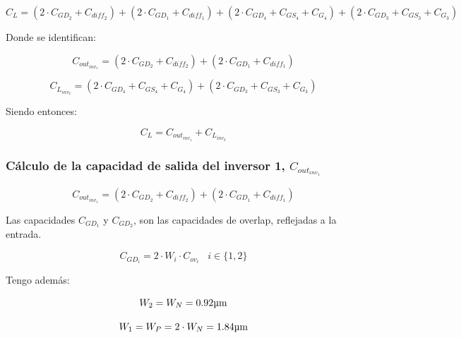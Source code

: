 \begin{equation}
C_{L} = \left( 2 \cdot C_{GD_{2}} + C_{diff_{2}} \right) + \left( 2 \cdot C_{GD_{1}} + C_{diff_{1}} \right) + \left( 2 \cdot C_{GD_{4}} + C_{GS_{4}} + C_{G_{4}} \right) + \left( 2 \cdot C_{GD_{3}} + C_{GS_{3}} + C_{G_{3}} \right)
\end{equation}


Donde se identifican:


\begin{equation*}
C_{out_{inv_{1}}} = \left( 2 \cdot C_{GD_{2}} + C_{diff_{2}} \right) + \left( 2 \cdot C_{GD_{1}} + C_{diff_{1}} \right)
\end{equation*}


\begin{equation*}
C_{L_{inv_{2}}} = \left( 2 \cdot C_{GD_{4}} + C_{GS_{4}} + C_{G_{4}} \right) + \left( 2 \cdot C_{GD_{3}} + C_{GS_{3}} + C_{G_{3}} \right)
\end{equation*}


Siendo entonces:


\begin{equation*}
C_{L} = C_{out_{inv_{1}}} + C_{L_{inv_{2}}}
\end{equation*}



\subsubsection{Cálculo de la capacidad de salida del inversor 1, $C_{out_{inv_{1}}}$}


\begin{equation*}
C_{out_{inv_{1}}} = \left( 2 \cdot C_{GD_{2}} + C_{diff_{2}} \right) + \left( 2 \cdot C_{GD_{1}} + C_{diff_{1}} \right)
\end{equation*}


Las capacidades $C_{GD_{1}}$ y $C_{GD_{2}}$, son las capacidades de overlap, reflejadas a la entrada.


\begin{equation*}
C_{GD_{i}} = 2 \cdot W_{i} \cdot C_{ov_{i}}  \; \; \;   i \in \{ 1, 2 \}
\end{equation*}


Tengo además:

\begin{equation*}
W_{2}= W_{N} = 0.92 \si[per-mode=symbol]{\micro\meter}
\end{equation*}

\begin{equation*}
W_{1}= W_{P} = 2 \cdot W_{N} = 1.84 \si[per-mode=symbol]{\micro\meter}
\end{equation*}

